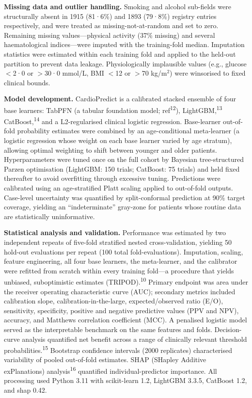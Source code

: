 \documentclass[english,11pt]{article}
\begin{document}
\textbf{Missing data and outlier handling.}
Smoking and alcohol sub-fields were structurally absent in 1915 (81·6\%) and 1893 (79·8\%) registry entries respectively, and were treated as missing-not-at-random and set to zero. Remaining missing values---physical activity (37\% missing) and several haematological indices---were imputed with the training-fold median. Imputation statistics were estimated within each training fold and applied to the held-out partition to prevent data leakage. Physiologically implausible values (e.g., glucose $<$2·0 or $>$30·0 mmol/L, BMI $<$12 or $>$70 kg/m$^{2}$) were winsorised to fixed clinical bounds.

\textbf{Model development.}
CardioPredict is a calibrated stacked ensemble of four base learners: TabPFN (a tabular foundation model; ref\textsuperscript{12}), LightGBM,\textsuperscript{13} CatBoost,\textsuperscript{14} and a L2-regularised clinical logistic regression. Base-learner out-of-fold probability estimates were combined by an age-conditional meta-learner (a logistic regression whose weight on each base learner varied by age stratum), allowing optimal weighting to shift between younger and older patients. Hyperparameters were tuned once on the full cohort by Bayesian tree-structured Parzen optimisation (LightGBM: 150 trials; CatBoost: 75 trials) and held fixed thereafter to avoid overfitting through excessive tuning. Predictions were calibrated using an age-stratified Platt scaling applied to out-of-fold outputs. Case-level uncertainty was quantified by split-conformal prediction at 90\% target coverage, yielding an ``indeterminate'' gray-zone for patients whose routine data are statistically uninformative.

\textbf{Statistical analysis and validation.}
Performance was estimated by two independent repeats of five-fold stratified nested cross-validation, yielding 50 hold-out evaluations per repeat (100 total fold-evaluations). Imputation, scaling, feature engineering, all four base learners, the meta-learner, and the calibrator were refitted from scratch within every training fold---a procedure that yields unbiased, suboptimistic estimates (TRIPOD).\textsuperscript{10} Primary endpoint was area under the receiver operating characteristic curve (AUC); secondary metrics included calibration slope, calibration-in-the-large, expected/observed ratio (E/O), sensitivity, specificity, positive and negative predictive values (PPV and NPV), accuracy, and Matthews correlation coefficient (MCC). A penalised logistic model served as the interpretable benchmark on the same features and folds. Decision-curve analysis quantified net benefit across a range of clinically relevant threshold probabilities.\textsuperscript{15} Bootstrap confidence intervals (2000 replicates) characterised variability of pooled out-of-fold estimates. SHAP (SHapley Additive exPlanations) analysis\textsuperscript{16} quantified individual-predictor importance. All processing used Python 3.11 with scikit-learn 1.2, LightGBM 3.3.5, CatBoost 1.2, and shap 0.42.
\end{document}
